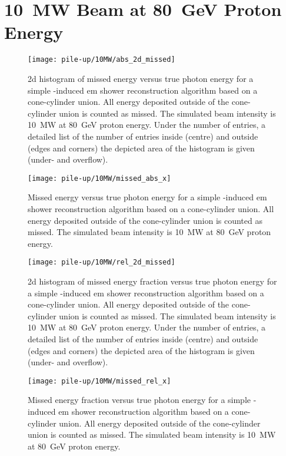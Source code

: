 \section{\SI{10}{\mega\watt} Beam at \SI{80}{\giga\electronvolt} Proton Energy}

\begin{figure}[htb]
	\centering
	\texttt{[image: pile-up/10MW/abs\_2d\_missed]}
	\caption{\gls{2d} histogram of missed energy versus true photon energy for a simple \Pgpz-induced \gls{em} shower reconstruction algorithm based on a cone-cylinder union.
		All energy deposited outside of the cone-cylinder union is counted as missed.
		The simulated beam intensity is \SI{10}{\mega\watt} at \SI{80}{\giga\electronvolt} proton energy.
		Under the number of entries, a detailed list of the number of entries inside (centre) and outside (edges and corners) the depicted area of the histogram is given (under- and overflow).}
\end{figure}

\begin{figure}[htb]
	\centering
	\texttt{[image: pile-up/10MW/missed\_abs\_x]}
	\caption{Missed energy versus true photon energy for a simple \Pgpz-induced \gls{em} shower reconstruction algorithm based on a cone-cylinder union.
		All energy deposited outside of the cone-cylinder union is counted as missed.
		The simulated beam intensity is \SI{10}{\mega\watt} at \SI{80}{\giga\electronvolt} proton energy.}
\end{figure}

\begin{figure}[htb]
	\centering
	\texttt{[image: pile-up/10MW/rel\_2d\_missed]}
	\caption{\gls{2d} histogram of missed energy fraction versus true photon energy for a simple \Pgpz-induced \gls{em} shower reconstruction algorithm based on a cone-cylinder union.
		All energy deposited outside of the cone-cylinder union is counted as missed.
		The simulated beam intensity is \SI{10}{\mega\watt} at \SI{80}{\giga\electronvolt} proton energy.
		Under the number of entries, a detailed list of the number of entries inside (centre) and outside (edges and corners) the depicted area of the histogram is given (under- and overflow).}
\end{figure}

\begin{figure}[htb]
	\centering
	\texttt{[image: pile-up/10MW/missed\_rel\_x]}
	\caption{Missed energy fraction versus true photon energy for a simple \Pgpz-induced \gls{em} shower reconstruction algorithm based on a cone-cylinder union.
		All energy deposited outside of the cone-cylinder union is counted as missed.
		The simulated beam intensity is \SI{10}{\mega\watt} at \SI{80}{\giga\electronvolt} proton energy.}
\end{figure}

